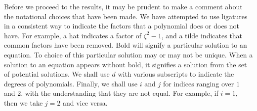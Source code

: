 Before we proceed to the results, it may be prudent to make a comment about the notational choices that have been made. We have attempted to use ligatures in a consistent way to indicate the factors that a polynomial does or does not have. For example, a hat indicates a factor of $ζ^2-1$, and a tilde indicates that common factors have been removed. Bold will signify a particular solution to an equation. To choice of this particular solution may or may not be unique. When a solution to an equation appears without bold, it signifies a solution from the set of potential solutions. We shall use $d$ with various subscripts to indicate the degrees of polynomials. Finally, we shall use $i$ and $j$ for indices ranging over $1$ and $2$, with the understanding that they are not equal. For example, if $i=1$, then we take $j=2$ and vice versa.




